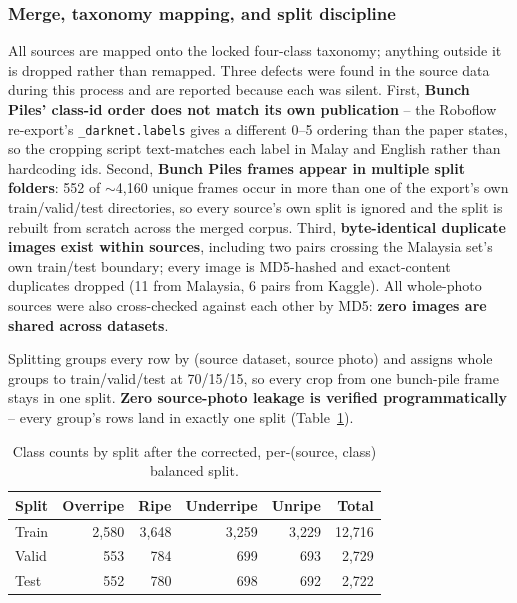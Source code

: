\documentclass{article}
\begin{document}
\subsubsection{Merge, taxonomy mapping, and split discipline}

All sources are mapped onto the locked four-class taxonomy; anything outside it is dropped rather than
remapped. Three defects were found in the source data during this process and are reported because each
was silent. First, \textbf{Bunch Piles' class-id order does not match its own publication} -- the Roboflow
re-export's \texttt{\_darknet.labels} gives a different 0--5 ordering than the paper states, so the
cropping script text-matches each label in Malay and English rather than hardcoding ids. Second,
\textbf{Bunch Piles frames appear in multiple split folders}: 552 of $\sim$4{,}160 unique frames occur in
more than one of the export's own train/valid/test directories, so every source's own split is ignored and
the split is rebuilt from scratch across the merged corpus. Third, \textbf{byte-identical duplicate images
exist within sources}, including two pairs crossing the Malaysia set's own train/test boundary; every
image is MD5-hashed and exact-content duplicates dropped (11 from Malaysia, 6 pairs from Kaggle). All
whole-photo sources were also cross-checked against each other by MD5: \textbf{zero images are shared
across datasets}.

Splitting groups every row by (source dataset, source photo) and assigns whole groups to train/valid/test
at 70/15/15, so every crop from one bunch-pile frame stays in one split. \textbf{Zero source-photo leakage
is verified programmatically} -- every group's rows land in exactly one split (Table~\ref{tab:split}).

\begin{table}[t]
\centering
\caption{Class counts by split after the corrected, per-(source, class) balanced split.}
\label{tab:split}
\begin{tabular}{@{}lrrrrr@{}}
\toprule
Split & Overripe & Ripe & Underripe & Unripe & Total \\
\midrule
Train & 2{,}580 & 3{,}648 & 3{,}259 & 3{,}229 & 12{,}716 \\
Valid & 553 & 784 & 699 & 693 & 2{,}729 \\
Test  & 552 & 780 & 698 & 692 & 2{,}722 \\
\bottomrule
\end{tabular}
\end{table}
\end{document}
